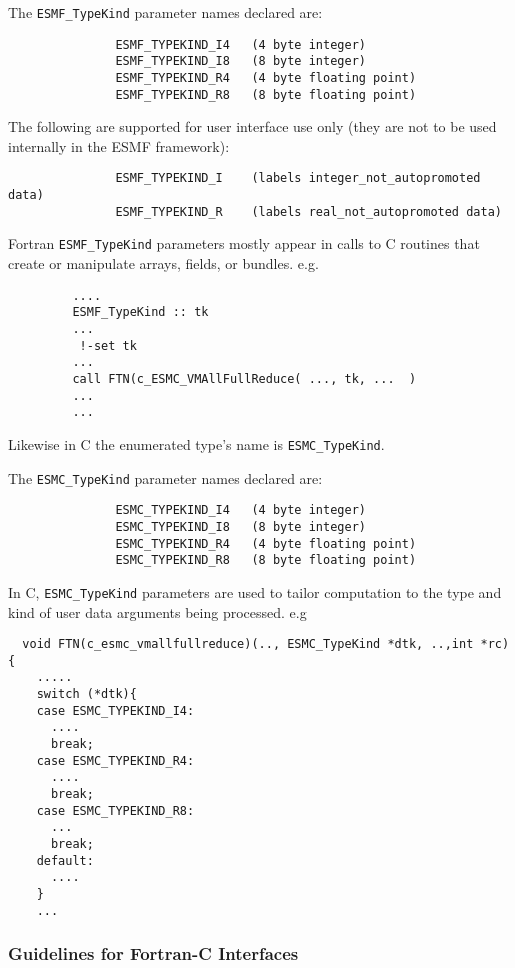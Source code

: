 The {\tt ESMF\_TypeKind} parameter names declared are:

\begin{verbatim}
               ESMF_TYPEKIND_I4   (4 byte integer)
               ESMF_TYPEKIND_I8   (8 byte integer)
               ESMF_TYPEKIND_R4   (4 byte floating point)
               ESMF_TYPEKIND_R8   (8 byte floating point)
\end{verbatim}

The following are supported for user interface use only (they are not to be used internally in the ESMF framework):
\begin{verbatim}
               ESMF_TYPEKIND_I    (labels integer_not_autopromoted data)
               ESMF_TYPEKIND_R    (labels real_not_autopromoted data)
\end{verbatim}

Fortran {\tt ESMF\_TypeKind} parameters mostly appear in calls to C routines that create or manipulate arrays, fields, or bundles. e.g.
\begin{verbatim}
         ....
         ESMF_TypeKind :: tk
         ...
          !-set tk
         ...
         call FTN(c_ESMC_VMAllFullReduce( ..., tk, ...  )
         ...
         ...
\end{verbatim}
Likewise in C the enumerated type's name is {\tt ESMC\_TypeKind}.

The {\tt ESMC\_TypeKind} parameter names declared are:
\begin{verbatim}
               ESMC_TYPEKIND_I4   (4 byte integer)
               ESMC_TYPEKIND_I8   (8 byte integer)
               ESMC_TYPEKIND_R4   (4 byte floating point)
               ESMC_TYPEKIND_R8   (8 byte floating point)
\end{verbatim}

In C, {\tt ESMC\_TypeKind} parameters are used to tailor computation to the type and kind of user data arguments being processed. e.g
\begin{verbatim}
  void FTN(c_esmc_vmallfullreduce)(.., ESMC_TypeKind *dtk, ..,int *rc){
    .....      
    switch (*dtk){
    case ESMC_TYPEKIND_I4:
      ....
      break;
    case ESMC_TYPEKIND_R4:
      ....
      break;
    case ESMC_TYPEKIND_R8:
      ...         
      break;
    default:
      ....
    }
    ...
\end{verbatim}

\subsubsection{Guidelines for Fortran-C Interfaces}

